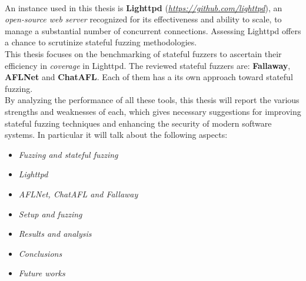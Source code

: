 \\An instance used in this thesis is \textbf{Lighttpd} (\textit{\href{https://github.com/lighttpd}{https://github.com/lighttpd}}), an \textit{open-source web server} recognized for its effectiveness and ability to scale, to manage a substantial number of concurrent connections. Assessing Lighttpd offers a chance to scrutinize stateful fuzzing methodologies.
\\This thesis focuses on the benchmarking of stateful fuzzers to ascertain their efficiency in \textit{coverage} in Lighttpd. The reviewed stateful fuzzers are: \textbf{Fallaway}, \textbf{AFLNet} and \textbf{ChatAFL}. Each of them has a its own approach toward stateful fuzzing.
\\By analyzing the performance of all these tools, this thesis will report the various strengths and weaknesses of each, which gives necessary suggestions for improving stateful fuzzing techniques and enhancing the security of modern software systems. In particular it will talk about the following aspects:
\begin{itemize}
    \item \textit{Fuzzing and stateful fuzzing}
    \item \textit{Lighttpd}
    \item \textit{AFLNet, ChatAFL and Fallaway}
    \item \textit{Setup and fuzzing}
    \item \textit{Results and analysis}
    \item \textit{Conclusions}
    \item \textit{Future works}
\end{itemize}